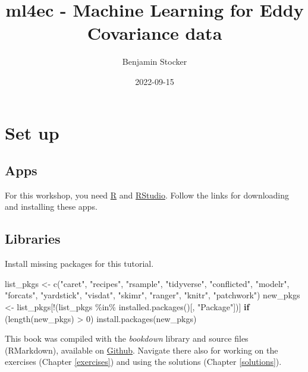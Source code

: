 \documentclass[
]{book}
\title{ml4ec - Machine Learning for Eddy Covariance data}
\author{Benjamin Stocker}
\date{2022-09-15}
\newenvironment{Shaded}{\begin{snugshade}}{\end{snugshade}}
\newcommand{\ControlFlowTok}[1]{\textcolor[rgb]{0.13,0.29,0.53}{\textbf{#1}}}
\newcommand{\DecValTok}[1]{\textcolor[rgb]{0.00,0.00,0.81}{#1}}
\newcommand{\FunctionTok}[1]{\textcolor[rgb]{0.00,0.00,0.00}{#1}}
\newcommand{\NormalTok}[1]{#1}
\newcommand{\OtherTok}[1]{\textcolor[rgb]{0.56,0.35,0.01}{#1}}
\newcommand{\SpecialCharTok}[1]{\textcolor[rgb]{0.00,0.00,0.00}{#1}}
\newcommand{\StringTok}[1]{\textcolor[rgb]{0.31,0.60,0.02}{#1}}
\begin{document}
\maketitle

{
\setcounter{tocdepth}{1}
\tableofcontents
}
\hypertarget{set-up}{%
\chapter{Set up}\label{set-up}}

\hypertarget{apps}{%
\section{Apps}\label{apps}}

For this workshop, you need \href{https://www.r-project.org/}{R} and \href{https://www.rstudio.com/products/rstudio/download/}{RStudio}. Follow the links for downloading and installing these apps.

\hypertarget{libraries}{%
\section{Libraries}\label{libraries}}

Install missing packages for this tutorial.

\begin{Shaded}
\begin{Highlighting}[]
\NormalTok{list\_pkgs }\OtherTok{\textless{}{-}} \FunctionTok{c}\NormalTok{(}\StringTok{"caret"}\NormalTok{, }\StringTok{"recipes"}\NormalTok{, }\StringTok{"rsample"}\NormalTok{, }\StringTok{"tidyverse"}\NormalTok{, }\StringTok{"conflicted"}\NormalTok{, }\StringTok{"modelr"}\NormalTok{, }\StringTok{"forcats"}\NormalTok{, }\StringTok{"yardstick"}\NormalTok{, }\StringTok{"visdat"}\NormalTok{, }\StringTok{"skimr"}\NormalTok{, }\StringTok{"ranger"}\NormalTok{, }\StringTok{"knitr"}\NormalTok{, }\StringTok{"patchwork"}\NormalTok{)}
\NormalTok{new\_pkgs }\OtherTok{\textless{}{-}}\NormalTok{ list\_pkgs[}\SpecialCharTok{!}\NormalTok{(list\_pkgs }\SpecialCharTok{\%in\%} \FunctionTok{installed.packages}\NormalTok{()[, }\StringTok{"Package"}\NormalTok{])]}
\ControlFlowTok{if}\NormalTok{ (}\FunctionTok{length}\NormalTok{(new\_pkgs) }\SpecialCharTok{\textgreater{}} \DecValTok{0}\NormalTok{) }\FunctionTok{install.packages}\NormalTok{(new\_pkgs)}
\end{Highlighting}
\end{Shaded}

This book was compiled with the \emph{bookdown} library and source files (RMarkdown), available on \href{https://github.com/stineb/ml4ec_workshop}{Github}. Navigate there also for working on the exercises (Chapter \ref{exercises}) and using the solutions (Chapter \ref{solutions}).
\end{document}
